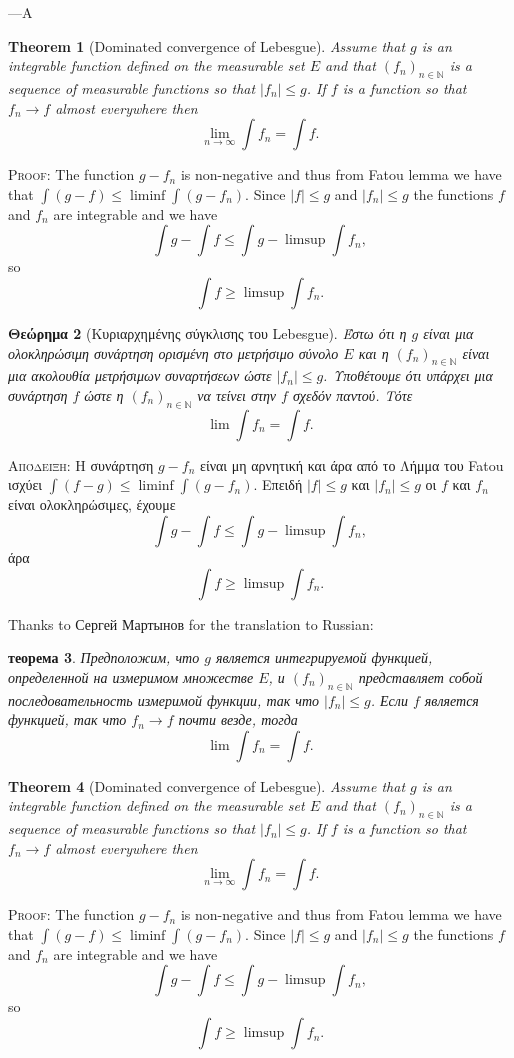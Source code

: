 \documentclass{article}
\newtheorem{theorem}{Theorem}
\newtheorem{theoremg}[theorem]{Θεώρημα}
\newtheorem{theoremr}[theorem]{теорема}
\begin{document}
---A

\begin{theorem}[Dominated convergence of Lebesgue]
Assume that $g$ is an
in\-te\-grable func\-tion defined on the measurable set $E$ and that
  $(f_n)_{n\in\mathbb N}$ is a sequence of mea\-sur\-able functions so that
  $|f_n|\leq g$. If $f$ is a function so that $f_n\to f$ almost everywhere
  then $$\lim_{n\to\infty}\int f_n=\int f.$$
\end{theorem}
\textsc{Proof}: The function $g-f_n$ is non-negative and thus from Fatou lemma
we have that $\int(g-f)\leq\liminf\int(g-f_n)$. Since $|f|\leq g$ and
$|f_n|\leq g$ the  functions $f$ and $f_n$ are integrable and we have
$$\int g-\int f\leq \int g-\limsup\int f_n,$$ so
$$\int f\geq \limsup \int f_n.$$

\begin{theoremg}[Κυριαρχημένης σύγκλισης του Lebesgue]
  Έστω ότι
η $g$ είναι μια ολοκληρώσιμη συνάρτηση ορισμένη στο μετρήσιμο σύνολο
$E$ και η $(f_n)_{n\in\mathbb N}$ είναι μια ακολουθία μετρήσιμων συναρτήσεων ώστε
$|f_n| ≤ g$. Υποθέτουμε ότι υπάρχει μια συνάρτηση $f$
ώστε η  $(f_n)_{n\in\mathbb N}$ να
τείνει στην $f$ σχεδόν παντού. Τότε
$$\lim \int f_n =\int f.$$
\end{theoremg}
\textsc{Απόδειξη}: Η συνάρτηση $g − f_n$ είναι μη αρνητική και άρα από
το Λήμμα του Fatou ισχύει
$\int (f-g) ≤ \liminf \int (g-f_n)$. Επειδή
$|f| ≤ g$ και $|f_n| ≤g$ οι $f$ και $f_n$ είναι ολοκληρώσιμες, έχουμε
$$\int g −\int f ≤ \int g − \limsup\int f_n,$$
άρα
$$\int f\geq \limsup \int f_n.$$

Thanks to Сергей Мартынов for the translation to Russian:
\begin{theoremr}
Предположим, что $g$ является
интегрируемой функцией, определенной на измеримом множестве $E$, и
$(f_n)_{n\in\mathbb N}$ представляет собой последовательность измеримой функции, так что
   $|f_n|\leq g$. Если $f$ является функцией, так что $f_n\to f$ почти везде,
   тогда
$$\lim \int f_n =\int f.$$
\end{theoremr}

\newpage


\sffamily

\begin{theorem}[Dominated convergence of Lebesgue]
Assume that $g$ is an
in\-te\-grable func\-tion defined on the measurable set $E$ and that
  $(f_n)_{n\in\mathbb N}$ is a sequence of mea\-sur\-able functions so that
  $|f_n|\leq g$. If $f$ is a function so that $f_n\to f$ almost everywhere
  then $$\lim_{n\to\infty}\int f_n=\int f.$$
\end{theorem}
\textsc{Proof}: The function $g-f_n$ is non-negative and thus from Fatou lemma
we have that $\int(g-f)\leq\liminf\int(g-f_n)$. Since $|f|\leq g$ and
$|f_n|\leq g$ the  functions $f$ and $f_n$ are integrable and we have
$$\int g-\int f\leq \int g-\limsup\int f_n,$$ so
$$\int f\geq \limsup \int f_n.$$
\end{document}
